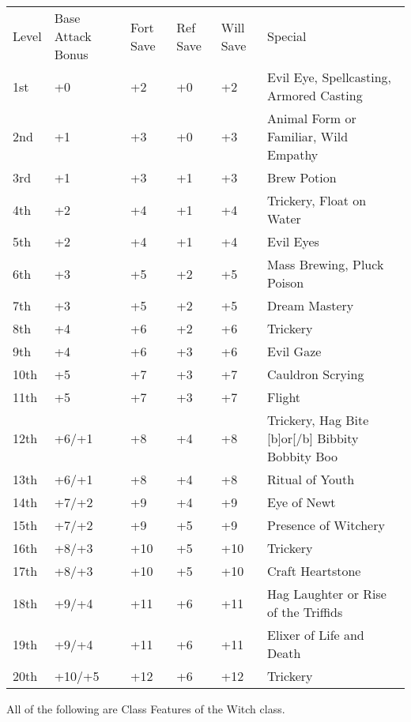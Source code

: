 \begin{table}[htb]
\begin{small}
\begin{tabular}{lp{3cm}p{0.7cm}p{0.7cm}p{0.7cm}l}
Level  &Base Attack Bonus &Fort Save &Ref Save &Will Save &Special\\
1st &+0 &+2 &+0 &+2 &Evil Eye, Spellcasting, Armored Casting\\
2nd &+1 &+3 &+0 &+3 &Animal Form or Familiar, Wild Empathy\\
3rd &+1 &+3 &+1 &+3 &Brew Potion\\
4th &+2 &+4 &+1 &+4 &Trickery, Float on Water\\
5th &+2 &+4 &+1 &+4 &Evil Eyes\\
6th &+3 &+5 &+2 &+5 &Mass Brewing, Pluck Poison\\
7th &+3 &+5 &+2 &+5 &Dream Mastery\\
8th &+4 &+6 &+2 &+6 &Trickery\\
9th &+4 &+6 &+3 &+6 &Evil Gaze\\
10th &+5 &+7 &+3 &+7 &Cauldron Scrying\\
11th &+5 &+7 &+3 &+7 &Flight\\
12th &+6/+1 &+8 &+4 &+8 &Trickery, Hag Bite [b]or[/b] Bibbity Bobbity Boo\\
13th &+6/+1 &+8 &+4 &+8 &Ritual of Youth\\
14th &+7/+2 &+9 &+4 &+9 &Eye of Newt\\
15th &+7/+2 &+9 &+5 &+9 &Presence of Witchery\\
16th &+8/+3 &+10 &+5 &+10 &Trickery\\
17th &+8/+3 &+10 &+5 &+10 &Craft Heartstone\\
18th &+9/+4 &+11 &+6 &+11 &Hag Laughter or Rise of the Triffids\\
19th &+9/+4 &+11 &+6 &+11 &Elixer of Life and Death\\
20th &+10/+5 &+12 &+6 &+12 &Trickery\\
\end{tabular}
\end{small}
\end{table}

\smallskip\noindent All of the following are Class Features of the Witch class.



